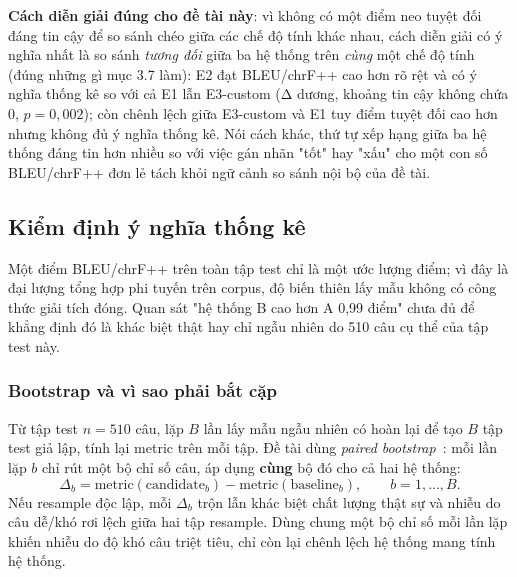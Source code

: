 \textbf{Cách diễn giải đúng cho đề tài này}: vì không có một điểm neo tuyệt đối đáng tin
cậy để so sánh chéo giữa các chế độ tính khác nhau, cách diễn giải có ý nghĩa nhất là so
sánh \emph{tương đối} giữa ba hệ thống trên \emph{cùng} một chế độ tính (đúng những gì
mục 3.7 làm): E2 đạt BLEU/chrF++ cao hơn rõ rệt và có ý nghĩa thống kê so với cả E1 lẫn
E3-custom (Δ dương, khoảng tin cậy không chứa 0, $p=0{,}002$); còn chênh lệch giữa
E3-custom và E1 tuy điểm tuyệt đối cao hơn nhưng không đủ ý nghĩa thống kê. Nói cách
khác, thứ tự xếp hạng giữa ba hệ thống đáng tin hơn nhiều so với việc gán nhãn "tốt" hay
"xấu" cho một con số BLEU/chrF++ đơn lẻ tách khỏi ngữ cảnh so sánh nội bộ của đề tài.

\subsection{Kiểm định ý nghĩa thống kê}

Một điểm BLEU/chrF++ trên toàn tập test chỉ là một ước lượng điểm; vì đây là đại lượng
tổng hợp phi tuyến trên corpus, độ biến thiên lấy mẫu không có công thức giải tích đóng.
Quan sát "hệ thống B cao hơn A 0,99 điểm" chưa đủ để khẳng định đó là khác biệt thật hay
chỉ ngẫu nhiên do 510 câu cụ thể của tập test này.

\subsubsection*{Bootstrap và vì sao phải bắt cặp}

Từ tập test $n=510$ câu, lặp $B$ lần lấy mẫu ngẫu nhiên có hoàn lại để tạo $B$ tập test
giả lập, tính lại metric trên mỗi tập. Đề tài dùng \textit{paired
bootstrap}~\cite{koehn2004bootstrap}: mỗi lần lặp $b$ chỉ rút một bộ chỉ số câu, áp dụng
\textbf{cùng} bộ đó cho cả hai hệ thống:
\begin{equation}
  \Delta_b = \text{metric}(\text{candidate}_b) - \text{metric}(\text{baseline}_b),
  \qquad b = 1, \dots, B.
  \label{eq:bootstrap-delta}
\end{equation}
Nếu resample độc lập, mỗi $\Delta_b$ trộn lẫn khác biệt chất lượng thật sự và nhiễu do
câu dễ/khó rơi lệch giữa hai tập resample. Dùng chung một bộ chỉ số mỗi lần lặp khiến
nhiễu do độ khó câu triệt tiêu, chỉ còn lại chênh lệch hệ thống mang tính hệ thống.

